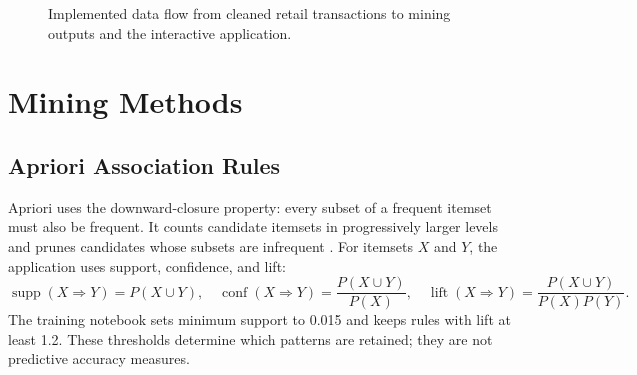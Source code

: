 \documentclass[10pt,conference]{IEEEtran}
\begin{document}
\begin{figure}[t]
\centering
{}
\caption{Implemented data flow from cleaned retail transactions to mining outputs and the interactive application.}
\label{fig:architecture}
\end{figure}

\section{Mining Methods}
\subsection{Apriori Association Rules}
Apriori uses the downward-closure property: every subset of a frequent itemset must also be frequent. It counts candidate itemsets in progressively larger levels and prunes candidates whose subsets are infrequent \cite{agrawal}. For itemsets $X$ and $Y$, the application uses support, confidence, and lift:
\begin{equation}
\operatorname{supp}(X\Rightarrow Y)=P(X\cup Y),\quad
\operatorname{conf}(X\Rightarrow Y)=\frac{P(X\cup Y)}{P(X)},\quad
\operatorname{lift}(X\Rightarrow Y)=\frac{P(X\cup Y)}{P(X)P(Y)}.
\end{equation}
The training notebook sets minimum support to 0.015 and keeps rules with lift at least 1.2. These thresholds determine which patterns are retained; they are not predictive accuracy measures.
\end{document}
